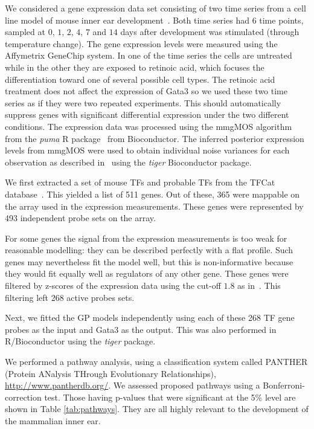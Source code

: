 \documentclass{article}
\begin{document}
We considered a gene expression data set consisting of two time series
from     a    cell     line     model    of     mouse    inner     ear
development~\cite{Helyer:model07}.   Both  time  series had  $6$  time
points,  sampled  at $0$,  $1$,  $2$, $4$,  $7$  and  $14$ days  after
development  was stimulated  (through temperature  change).   The gene
expression levels were measured  using the Affymetrix GeneChip system.
In one of  the time series the cells are untreated  while in the other
they are  exposed to retinoic acid, which  focuses the differentiation
toward  one  of  several  possible  cell  types.   The  retinoic  acid
treatment does not affect the expression of Gata3 so we used these two
time series  as if  they were two  repeated experiments.   This should
automatically suppress genes  with significant differential expression
under the two different conditions.  The expression data was processed
using    the    mmgMOS    algorithm    from    the    \emph{puma}    R
package~\cite{Liu:tractable04,Pearson:puma09}  from Bioconductor.  The
inferred posterior  expression levels from mmgMOS were  used to obtain
individual   noise  variances  for   each  observation   as  described
in~\cite{Honkela:modelbased10}  using  the  \emph{tiger}  Bioconductor
package. %

We first extracted a set of  mouse TFs and probable TFs from the TFCat
database~\cite{Fulton2009}.  This yielded a list of 511 genes.  Out of
these,  365  were  mappable  on  the  array  used  in  the  expression
measurements.  These  genes were represented by  493 independent probe
sets on the array.

For some genes the signal from the expression measurements is too weak
for reasonable modelling: they can  be described perfectly with a flat
profile.  Such genes may nevertheless  fit the model well, but this is
non-informative because  they would fit equally well  as regulators of
any  other  gene.   These  genes  were filtered  by  z-scores  of  the
expression      data     using      the      cut-off     $1.8$      as
in~\cite{Honkela:modelbased10}.  This filtering left 268 active probes
sets.

Next, we fitted the GP models independently using each of these 268 TF
gene  probes as  the input  and Gata3  as the  output.  This  was also
performed in R/Bioconductor using the \emph{tiger} package.

We performed a pathway  analysis, using a classification system called
PANTHER   (Protein  ANalysis   THrough   Evolutionary  Relationships),
\url{http://www.pantherdb.org/}.  We  assessed proposed pathways using
a  Bonferroni-correction  test.    Those  having  p-values  that  were
significant    at    the    5\%    level   are    shown    in    Table
\ref{tab:pathways}. They are all highly relevant to the development of
the mammalian inner ear.
\end{document}
